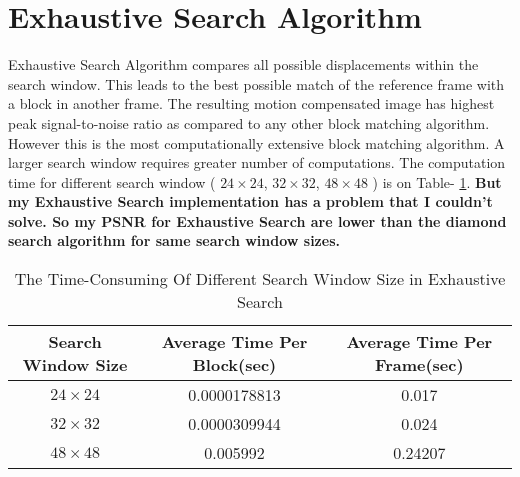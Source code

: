 \documentclass[]{article}
\begin{document}
\section{Exhaustive Search Algorithm}
	\justifying Exhaustive Search Algorithm compares all possible displacements within the search window. This leads to the best possible match of the reference frame with a block in another frame. The resulting motion compensated image has highest peak signal-to-noise ratio as compared to any other block matching algorithm. However this is the most computationally extensive block matching algorithm. A larger search window requires greater number of computations. The computation time for  different search window ( $24 \times 24 $, $32 \times 32 $,  $48 \times 48 $ ) is on Table-  \ref{tab:table_1}. \textbf{But my Exhaustive Search implementation has a problem that I couldn't solve. So my PSNR for Exhaustive Search are lower than the diamond search algorithm for same search window sizes.} 
	    \begin{table}[H] %

   			\begin{tabular}{c c c }
   				Search Window Size & Average Time Per Block(sec) & Average Time Per Frame(sec)\\ \hline\hline 
   				$24 \times 24 $ & 0.0000178813 & 0.017 \\  \hline
   				$32 \times 32 $ & 0.0000309944 & 0.024 \\ \hline
   				$48 \times 48 $ & 0.005992 & 0.24207 \\ \hline
   			\end{tabular}
   			\centering	
   			\label{tab:table_1}	
   			\caption[The Time-Consuming Of Different Search Window Size in Exhaustive Search]{The Time-Consuming Of Different Search Window Size in Exhaustive Search }
   		\end{table}
   		\begin{figure}[H]
   				 	\centering
   					\hfill
   		\end{figure}
   		\begin{figure}[H]
   					 	\centering
   						\hfill
   			\end{figure}
\end{document}
